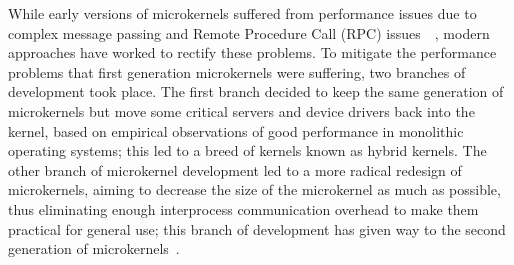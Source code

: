 
%
%
%

While early versions of microkernels suffered from performance issues due to complex message passing and Remote Procedure Call (RPC) issues~\cite{stallings2005}~\cite{liedtke1996}, modern approaches have worked to rectify these problems. 
%
To mitigate the performance problems that first generation microkernels were
suffering, two branches of development took place.  The first branch decided
to keep the same generation of microkernels but move some critical servers
and device drivers back into the kernel, based on empirical observations of
good performance in monolithic operating systems; this led to a breed of
kernels known as hybrid kernels.
The other branch of microkernel development led to a more radical
redesign of microkernels, aiming to decrease the size of the microkernel
as much as possible, thus eliminating enough interprocess communication
overhead to make them practical for general use; this branch of
development has given way to the second generation of
microkernels~\cite{liedtke1996}.

